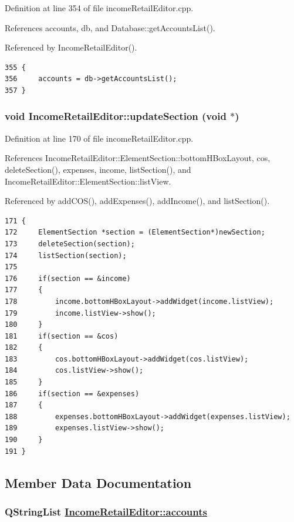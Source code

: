 Definition at line 354 of file income\-Retail\-Editor.cpp.

References accounts, db, and Database::get\-Accounts\-List().

Referenced by Income\-Retail\-Editor().

\footnotesize\begin{verbatim}355 {
356     accounts = db->getAccountsList();
357 }
\end{verbatim}\normalsize 


\hypertarget{classIncomeRetailEditor_k0}{
\subsubsection[updateSection]{\setlength{\rightskip}{0pt plus 5cm}void Income\-Retail\-Editor::update\-Section (void $\ast$)}}
\label{classIncomeRetailEditor_k0}


Definition at line 170 of file income\-Retail\-Editor.cpp.

References Income\-Retail\-Editor::Element\-Section::bottom\-HBox\-Layout, cos, delete\-Section(), expenses, income, list\-Section(), and Income\-Retail\-Editor::Element\-Section::list\-View.

Referenced by add\-COS(), add\-Expenses(), add\-Income(), and list\-Section().

\footnotesize\begin{verbatim}171 {
172     ElementSection *section = (ElementSection*)newSection;
173     deleteSection(section);
174     listSection(section);
175     
176     if(section == &income) 
177     {
178         income.bottomHBoxLayout->addWidget(income.listView);
179         income.listView->show();
180     }
181     if(section == &cos) 
182     {
183         cos.bottomHBoxLayout->addWidget(cos.listView);
184         cos.listView->show();
185     }
186     if(section == &expenses) 
187     {
188         expenses.bottomHBoxLayout->addWidget(expenses.listView);
189         expenses.listView->show();
190     }
191 }
\end{verbatim}\normalsize 




\subsection{Member Data Documentation}
\hypertarget{classIncomeRetailEditor_r1}{
\subsubsection[accounts]{\setlength{\rightskip}{0pt plus 5cm}QString\-List \hyperlink{classIncomeRetailEditor_r1}{Income\-Retail\-Editor::accounts}}}
\label{classIncomeRetailEditor_r1}


